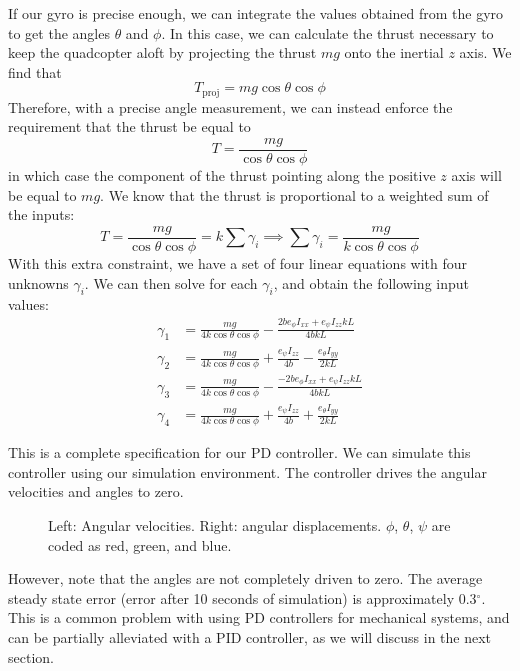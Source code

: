 \documentclass{article}
\begin{document}
If our gyro is precise enough, we can integrate the values obtained from the gyro to get the angles
$\theta$ and $\phi$. In this case, we can calculate the thrust necessary to keep the quadcopter
aloft by projecting the thrust $mg$ onto the inertial $z$ axis. We find that
\[T_\text{proj} = mg\cos\theta\cos\phi\]
Therefore, with a precise angle measurement, we can instead enforce the requirement that the thrust
be equal to
\[T = \frac{mg}{\cos\theta\cos\phi}\]
in which case the component of the thrust pointing along the positive $z$ axis will be equal to $mg$.
We know that the thrust is proportional to a weighted sum of the inputs:
\[T = \frac{mg}{\cos\theta\cos\phi} = k\sum \gamma_i \implies \sum\gamma_i = \frac{mg}{k\cos\theta\cos\phi}\]
With this extra constraint, we have a set of four linear equations with four unknowns $\gamma_i$. We
can then solve for each $\gamma_i$, and obtain the following input values:
\begin{align*}
    \gamma_1 &= \frac{mg}{4k\cos\theta\cos\phi}-\frac{2 b {e_\phi} {I_{xx}}+{e_\psi} {I_{zz}} k L}{4 b k L} \\
    \gamma_2 &= \frac{mg}{4k\cos\theta\cos\phi}+\frac{{e_\psi} {I_{zz}}}{4 b}-\frac{{e_\theta} {I_{yy}}}{2 k L} \\
    \gamma_3 &= \frac{mg}{4k\cos\theta\cos\phi}-\frac{-2 b {e_\phi} {I_{xx}}+{e_\psi} {I_{zz}} k L}{4 b k L} \\
    \gamma_4 &= \frac{mg}{4k\cos\theta\cos\phi}+\frac{{e_\psi} {I_{zz}}}{4 b}+\frac{{e_\theta} {I_{yy}}}{2 k L}
\end{align*}

This is a complete specification for our PD controller. We can simulate this controller using our simulation environment. 
The controller drives the angular velocities and angles to zero.
\begin{figure}[h]
    \caption{
        Left: Angular velocities. Right: angular displacements. $\phi$, $\theta$, $\psi$ are coded as red, green, and blue.
    }
    \label{pd}
\end{figure}
However, note that the angles are not completely driven to zero. The average steady state error
(error after 10 seconds of simulation) is approximately 0.3$^\circ$. This is a common problem with
using PD controllers for mechanical systems, and can be partially alleviated with a PID controller,
as we will discuss in the next section.
\end{document}
